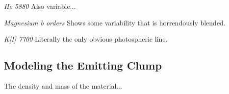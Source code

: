 \documentclass{nature3}
\begin{document}
\begin{methods}
{\it He 5880}
Also variable...

{\it Magnesium b orders}
Shows some variability that is horrendously blended.

{\it K[I] 7700}
Literally the only obvious photospheric line.



\subsection{Modeling the Emitting Clump}
\label{subsec:model}

The density and mass of the material...





\end{methods}
\end{document}
